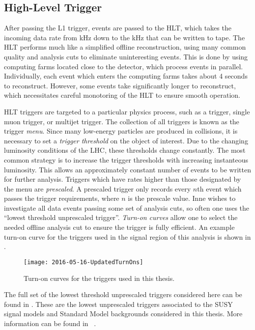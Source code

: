 \subsection{High-Level Trigger}

After passing the L1 trigger, events are passed to the HLT, which takes the incoming data rate from  kHz down to the  kHz that can be written to tape.
The HLT performs much like a simplified offline reconstruction, using many common quality and analysis cuts to eliminate uninteresting events.
This is done by using computing farms located close to the detector, which process events in parallel.
Individually, each event which enters the computing farms takes about 4 seconds to reconstruct.
However, some events take significantly longer to reconstruct, which necessitates careful monotoring of the HLT to ensure smooth operation.

HLT triggers are targeted to a particular physics process, such as a \met trigger, single muon trigger, or multijet trigger.
The collection of all triggers is known as the trigger \textit{menu}.
Since many low-energy particles are produced in collisions, it is necessary to set a \textit{trigger threshold} on the object of interest.
Due to the changing luminosity conditions of the LHC, these thresholds change constantly.
The most common strategy is to increase the trigger thresholds with increasing instanteous luminosity.
This allows an approximately constant number of events to be written for further analysis.
Triggers which have rates higher than those designated by the menu are \textit{prescaled}.
A prescaled trigger only records every $n$th event which passes the trigger requirements, where $n$ is the prescale value.
Inne wishes to investigate all data events passing some set of analysis cuts, so often one uses the ``lowest threshold unprescaled trigger''.
\textit{Turn-on curves} allow one to select the needed offline analysis cut to ensure the trigger is fully efficient.
An example turn-on curve for the \met triggers used in the signal region of this analysis is shown in .
\begin{figure}[tbp]
\caption{Turn-on curves for the \met triggers used in this thesis.} \label{fig:met_turnon}
\texttt{[image: 2016-05-16-UpdatedTurnOns]}
\end{figure}

The full set of the lowest threshold unprescaled triggers considered here can be found in .
These are the lowest unprescaled triggers associated to the SUSY signal models and Standard Model backgrounds considered in this thesis.
More information can be found in ~\cite{ATL-DAQ-PUB-2016-001}.

